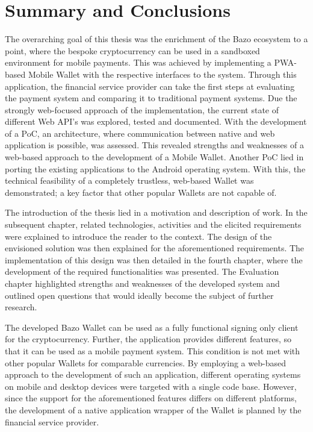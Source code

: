 \chapter{Summary and Conclusions}

The overarching goal of this thesis was the enrichment of the Bazo ecosystem to a point, where the bespoke cryptocurrency can be used in a sandboxed environment for mobile payments. This was achieved by implementing a PWA-based Mobile Wallet with the respective interfaces to the system. Through this application, the financial service provider can take the first steps at evaluating the payment system and comparing it to traditional payment systems. Due the strongly web-focused approach of the implementation, the current state of different Web API's was explored, tested and documented. With the development of a PoC, an architecture, where communication between native and web application is possible, was assessed. This revealed strengths and weaknesses of a web-based approach to the development of a Mobile Wallet. Another PoC lied in porting the existing applications to the Android operating system. With this, the technical feasibility of a completely trustless, web-based Wallet was demonstrated; a key factor that other popular Wallets are not capable of.

The introduction of the thesis lied in a motivation and description of work. In the subsequent chapter, related technologies, activities and the elicited requirements were explained to introduce the reader to the context. The design of the envisioned solution was then explained for the aforementioned requirements. The implementation of this design was then detailed in the fourth chapter, where the development of the required functionalities was presented. The Evaluation chapter highlighted strengths and weaknesses of the developed system and outlined open questions that would ideally become the subject of further research.

The developed Bazo Wallet can be used as a fully functional signing only client for the cryptocurrency. Further, the application provides different features, so that it can be used as a mobile payment system. This condition is not met with other popular Wallets for comparable currencies. By employing a web-based approach to the development of such an application, different operating systems on mobile and desktop devices were targeted with a single code base. However, since the support for the aforementioned features differs on different platforms, the development of a native application wrapper of the Wallet is planned by the financial service provider. 